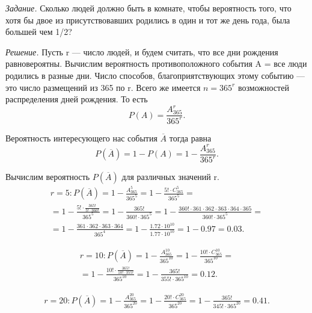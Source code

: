 \documentclass{book}
\begin{document}
\textit{Задание.} Сколько людей должно быть в комнате, чтобы вероятность того, что хотя бы двое из присутствовавших родились в один и тот же день года, была большей чем 1/2?

\textit{Решение.} Пусть r --- число людей, и будем считать, что все дни рождения равновероятны.
Вычислим вероятность противоположного события A = {все люди родились в разные дни}.
Число способов, благоприятствующих этому событию --- это число размещений из 365 по r.
Всего же имеется $ n = 365^r $ возможностей распределения дней рождения.
То есть
$$ P(A) =
\frac{A_{365}^r}{365^r}.$$

Вероятность интересующего нас события $ \overline{A} $ тогда равна
$$ P \left( \overline{A} \right) =
1 - P \left( A \right) =
1 - \frac{A_{365}^r}{365^r}.$$

Вычислим вероятность $ P \left( \overline{A} \right) $ для различных значений r.
\begin{equation*}
\begin{split}
r = 5 : P \left( \overline{A} \right) =
1 - \frac{A_{365}^5}{365^5} =
1 - \frac{5! \cdot C_{365}^5}{365^5} = \\
= 1 - \frac{5! \cdot \frac{365!}{5! \cdot 360!} }{365^5} =
1 - \frac{365!}{360! \cdot 365^5} =
1 - \frac{360! \cdot 361 \cdot 362 \cdot 363 \cdot 364 \cdot 365}{360! \cdot 365^5} = \\
= 1 - \frac{361 \cdot 362 \cdot 363 \cdot 364}{365^4} =
1 - \frac{1.72 \cdot 10^10}{1.77 \cdot 10^10} =
1 - 0.97 =
0.03.
\end{split}
\end{equation*}

\begin{equation*}
\begin{split}
r = 10 :
P \left( \overline{A} \right) =
1 - \frac{A_{365}^{10}}{365^{10}} =
1- \frac{10! \cdot C_{365}^{10}}{365^{10}} = \\
= 1 - \frac{10! \cdot \frac{365!}{10! \cdot 355!}}{365^{10}} =
1 - \frac{365!}{355! \cdot 365^{10}} =
0.12.
\end{split}
\end{equation*}

\begin{equation*}
\begin{split}
r = 20 :
P \left( \overline{A} \right) =
1 - \frac{A_{365}^{20}}{365^{20}} =
1 - \frac{20! \cdot C_{365}^{20}}{365^{20}} =
1 - \frac{365!}{345! \cdot 365^{20}} =
0.41.
\end{split}
\end{equation*}
\end{document}
